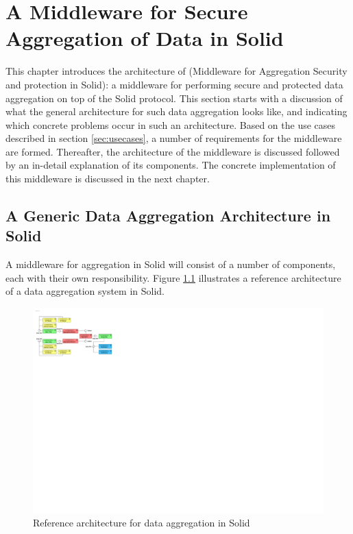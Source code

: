 \chapter{A Middleware for Secure Aggregation of Data in Solid}
\label{cha:solution-overview}
This chapter introduces the architecture of \middleware{} (Middleware for Aggregation Security and protection in Solid): a middleware for performing secure and protected data aggregation on top of the Solid protocol. This section starts with a discussion of what the general architecture for such data aggregation looks like, and indicating which concrete problems occur in such an architecture. Based on the use cases described in section \ref{sec:usecases}, a number of requirements for the middleware are formed. Thereafter, the architecture of the middleware is discussed followed by an in-detail explanation of its components. The concrete implementation of this middleware is discussed in the next chapter.

\section{A Generic Data Aggregation Architecture in Solid}
A middleware for aggregation in Solid will consist of a number of components, each with their own responsibility. Figure \ref{fig:reference-architecture} illustrates a reference architecture of a data aggregation system in Solid. 

\begin{figure}[h]
    \centering
    \includegraphics[width=1.0\textwidth]{images/architecture/Reference-Architecture-Aggregator.pdf}
    \caption{Reference architecture for data aggregation in Solid}
    \label{fig:reference-architecture}
\end{figure}

